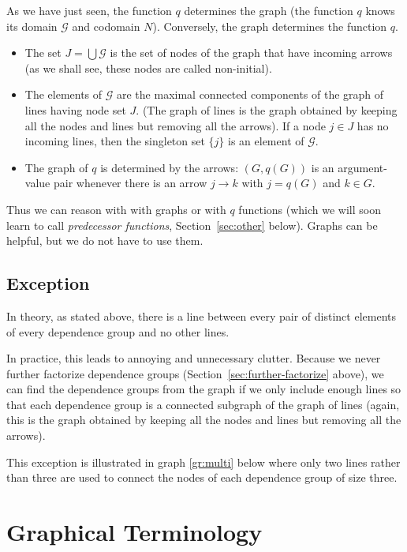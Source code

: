 As we have just seen, the function $q$ determines the graph
(the function $q$ knows its domain $\mathcal{G}$ and codomain $N$).
Conversely, the graph determines the function $q$.
\begin{itemize}
\item The set $J = \bigcup \mathcal{G}$ is the set of nodes of the graph
    that have incoming arrows (as we shall see, these nodes are called
    non-initial).
\item The elements of $\mathcal{G}$ are the maximal connected components
    of the graph of lines having node set $J$.
    (The graph of lines is the graph obtained by keeping all the nodes
    and lines but removing all the arrows).
    If a node $j \in J$ has no incoming lines, then the singleton set $\{j\}$
    is an element of $\mathcal{G}$.
\item The graph of $q$ is determined by the arrows: $(G, q(G))$ is an
    argument-value pair whenever there is an arrow $j \longrightarrow k$
    with $j = q(G)$ and $k \in G$.
\end{itemize}

Thus we can reason with with graphs or with $q$ functions (which we will
soon learn to call \emph{predecessor functions}, Section~\ref{sec:other} below).
Graphs can be helpful, but we do not have to use them.

\subsection{Exception}
\label{sec:exception-dependence-group-lines}

In theory, as stated above, there is a line between every pair of distinct
elements of every dependence group and no other lines.

In practice, this leads to annoying and unnecessary clutter.
Because we never further factorize dependence groups
(Section~\ref{sec:further-factorize} above), we can find the dependence
groups from the graph if we only include enough lines so that each
dependence group is a connected subgraph of the graph of lines
(again, this is the graph obtained by keeping all the nodes and lines but
removing all the arrows).

This exception is illustrated in graph \eqref{gr:multi} below
where only two lines
rather than three are used to connect the nodes of each
dependence group of size three.

\section{Graphical Terminology}
\label{sec:graphical-terminology}

